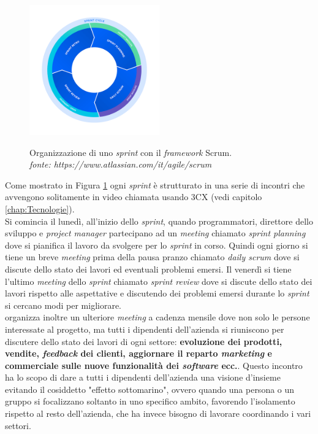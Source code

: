 \begin{figure}[H]
      \centering
      \includegraphics[alt={Organizzazione di uno \textit{sprint} con il \textit{framework} Scrum}, width=0.5\textwidth]{img/scrum.png}
      \caption[Organizzazione di uno \textit{sprint} con il \textit{framework} Scrum]
              {Organizzazione di uno \textit{sprint} con il \textit{framework} Scrum. \\ \textit{fonte: https://www.atlassian.com/it/agile/scrum}}
      \label{fig:scrum}
  \end{figure}

Come mostrato in Figura \ref{fig:scrum} ogni \textit{sprint} è strutturato in una serie di incontri che avvengono solitamente in video chiamata usando 
3CX (vedi capitolo \ref{chap:Tecnologie}).\\ 
Si comincia il lunedì, all'inizio dello \textit{sprint}, quando programmatori, direttore dello sviluppo e \textit{project manager} partecipano 
ad un \textit{meeting} chiamato \textit{sprint planning} dove si pianifica il lavoro da svolgere per lo \textit{sprint} in corso.
Quindi ogni giorno si tiene un breve \textit{meeting} prima della pausa pranzo chiamato \textit{daily scrum} dove si discute dello stato dei lavori ed 
eventuali problemi emersi.
Il venerdì si tiene l'ultimo \textit{meeting} dello \textit{sprint} chiamato \textit{sprint review} dove si discute 
dello stato dei lavori rispetto alle aspettative e discutendo dei problemi emersi durante lo \textit{sprint} si cercano modi per migliorare.\\
{\company} organizza inoltre un ulteriore \textit{meeting} a cadenza mensile dove non solo le persone interessate al progetto, ma tutti i dipendenti dell'azienda 
si riuniscono per discutere dello stato dei lavori di ogni settore: \textbf{evoluzione dei prodotti, vendite, \textit{feedback} dei clienti, aggiornare il reparto \textit{marketing}
 e commerciale sulle nuove funzionalità dei \textit{software} ecc.}. Questo incontro ha 
lo scopo di dare a tutti i dipendenti dell'azienda una visione d'insieme evitando il cosiddetto "effetto sottomarino", ovvero quando una persona o un gruppo si focalizzano 
soltanto in uno specifico ambito, favorendo l'isolamento rispetto al resto dell'azienda, che ha invece bisogno di lavorare coordinando i vari settori.